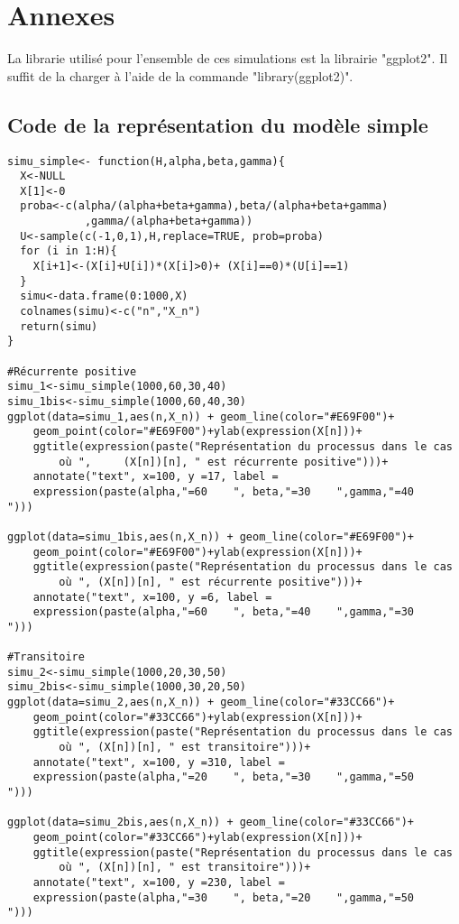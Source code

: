 \documentclass[12pt,a4paper]{report}
\theoremstyle{remark}
\begin{document}
\chapter*{Annexes}
La librarie utilisé pour l'ensemble de ces simulations est la librairie "ggplot2". Il suffit de la charger à l'aide de la commande "library(ggplot2)".

\section*{Code de la représentation du modèle simple}

\begin{lstlisting}
simu_simple<- function(H,alpha,beta,gamma){
  X<-NULL
  X[1]<-0
  proba<-c(alpha/(alpha+beta+gamma),beta/(alpha+beta+gamma)
            ,gamma/(alpha+beta+gamma))
  U<-sample(c(-1,0,1),H,replace=TRUE, prob=proba)
  for (i in 1:H){
    X[i+1]<-(X[i]+U[i])*(X[i]>0)+ (X[i]==0)*(U[i]==1)
  }
  simu<-data.frame(0:1000,X)
  colnames(simu)<-c("n","X_n")
  return(simu)
}

#Récurrente positive
simu_1<-simu_simple(1000,60,30,40)
simu_1bis<-simu_simple(1000,60,40,30)
ggplot(data=simu_1,aes(n,X_n)) + geom_line(color="#E69F00")+
    geom_point(color="#E69F00")+ylab(expression(X[n]))+ 
    ggtitle(expression(paste("Représentation du processus dans le cas 
        où ",     (X[n])[n], " est récurrente positive")))+
    annotate("text", x=100, y =17, label = 
    expression(paste(alpha,"=60    ", beta,"=30    ",gamma,"=40    ")))

ggplot(data=simu_1bis,aes(n,X_n)) + geom_line(color="#E69F00")+
    geom_point(color="#E69F00")+ylab(expression(X[n]))+
    ggtitle(expression(paste("Représentation du processus dans le cas
        où ", (X[n])[n], " est récurrente positive")))+
    annotate("text", x=100, y =6, label =
    expression(paste(alpha,"=60    ", beta,"=40    ",gamma,"=30    ")))

#Transitoire
simu_2<-simu_simple(1000,20,30,50)
simu_2bis<-simu_simple(1000,30,20,50)
ggplot(data=simu_2,aes(n,X_n)) + geom_line(color="#33CC66")+
    geom_point(color="#33CC66")+ylab(expression(X[n]))+ 
    ggtitle(expression(paste("Représentation du processus dans le cas 
        où ", (X[n])[n], " est transitoire")))+
    annotate("text", x=100, y =310, label = 
    expression(paste(alpha,"=20    ", beta,"=30    ",gamma,"=50    ")))
    
ggplot(data=simu_2bis,aes(n,X_n)) + geom_line(color="#33CC66")+
    geom_point(color="#33CC66")+ylab(expression(X[n]))+ 
    ggtitle(expression(paste("Représentation du processus dans le cas 
        où ", (X[n])[n], " est transitoire")))+
    annotate("text", x=100, y =230, label = 
    expression(paste(alpha,"=30    ", beta,"=20    ",gamma,"=50    ")))


\end{lstlisting}
\end{document}
